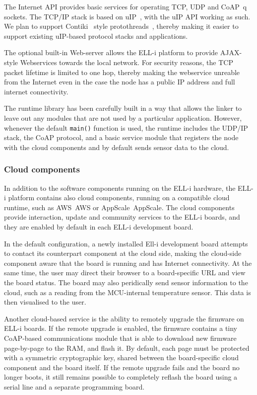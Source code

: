 \documentclass[draft,a4paper]{siamltex}
\begin{document}
The Internet API provides basic services for operating TCP, UDP and
CoAP~\cite{CoAP}q sockets.  The TCP/IP stack is based on
uIP~\cite{uIP}, with the
uIP API working as such.  We plan to support Contiki~\cite{Contiki}
style protothreads~\cite{protothreads}, thereby making it easier to
support existing uIP-based protocol stacks and applications.

The optional built-in Web-server allows the ELL-i platform to provide
AJAX-style Webservices towards the local network.  For security
reasons, the TCP packet lifetime is limited to one hop, thereby making
the webservice unreable from the Internet even in the case the node
has a public IP address and full internet connectivity.

The runtime library has been carefully built in a way that allows the
linker to leave out any modules that are not used by a particular
application.  However, whenever the default \hbox{\tt main()} function
is used, the runtime includes the UDP/IP stack, the CoAP protocol, and
a basic service module that registers the node with the cloud
components and by default sends sensor data to the cloud.

\subsubsection{Cloud components}

In addition to the software components running on the ELL-i hardware,
the ELL-i platform contains also cloud components, running on a
compatible cloud runtime, such as AWS~{AWS} or AppScale~{AppScale}.
The cloud components provide interaction, update and community
services to the ELL-i boards, and they are enabled by default in each
ELL-i development board.

In the default configuration, a newly installed Ell-i development
board attempts to contact its counterpart component at the cloud
side, making the cloud-side component aware that the board is running
and has Internet connectivity.  At the same time, the user may direct
their browser to a board-specific URL and view the board status.  The
board may also peridically send sensor information to the cloud, such
as a reading from the MCU-internal temperature sensor.  This data is
then visualised to the user.

Another cloud-based service is the ability to remotely upgrade the
firmware on ELL-i boards.  If the remote upgrade is enabled, the
firmware contains a tiny CoAP-based communications module that is able
to download new firmware page-by-page to the RAM, and flash it.  By
default, each page must be protected with a symmetric cryptographic
key, shared between the board-specific cloud component and the board
itself.  If the remote upgrade fails and the board no longer boots, it
still remains possible to completely reflash the board using a serial
line and a separate programming board.
\end{document}
